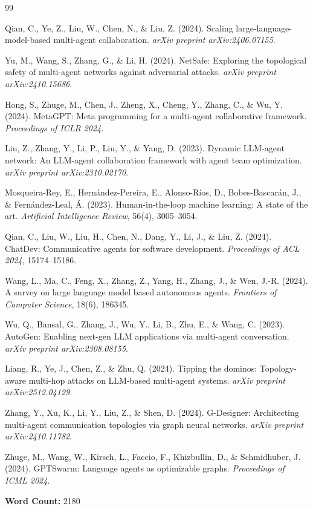 \documentclass[12pt, a4paper]{article}
\begin{document}
\newpage
\begin{thebibliography}{99}

Qian, C., Ye, Z., Liu, W., Chen, N., \& Liu, Z. (2024). Scaling large-language-model-based multi-agent collaboration. \textit{arXiv preprint arXiv:2406.07155}.

Yu, M., Wang, S., Zhang, G., \& Li, H. (2024). NetSafe: Exploring the topological safety of multi-agent networks against adversarial attacks. \textit{arXiv preprint arXiv:2410.15686}.

Hong, S., Zhuge, M., Chen, J., Zheng, X., Cheng, Y., Zhang, C., \& Wu, Y. (2024). MetaGPT: Meta programming for a multi-agent collaborative framework. \textit{Proceedings of ICLR 2024}.

Liu, Z., Zhang, Y., Li, P., Liu, Y., \& Yang, D. (2023). Dynamic LLM-agent network: An LLM-agent collaboration framework with agent team optimization. \textit{arXiv preprint arXiv:2310.02170}.

Mosqueira-Rey, E., Hern\'{a}ndez-Pereira, E., Alonso-R\'{i}os, D., Bobes-Bascar\'{a}n, J., \& Fern\'{a}ndez-Leal, \'{A}. (2023). Human-in-the-loop machine learning: A state of the art. \textit{Artificial Intelligence Review}, 56(4), 3005--3054.

Qian, C., Liu, W., Liu, H., Chen, N., Dang, Y., Li, J., \& Liu, Z. (2024). ChatDev: Communicative agents for software development. \textit{Proceedings of ACL 2024}, 15174--15186.

Wang, L., Ma, C., Feng, X., Zhang, Z., Yang, H., Zhang, J., \& Wen, J.-R. (2024). A survey on large language model based autonomous agents. \textit{Frontiers of Computer Science}, 18(6), 186345.

Wu, Q., Bansal, G., Zhang, J., Wu, Y., Li, B., Zhu, E., \& Wang, C. (2023). AutoGen: Enabling next-gen LLM applications via multi-agent conversation. \textit{arXiv preprint arXiv:2308.08155}.

Liang, R., Ye, J., Chen, Z., \& Zhu, Q. (2024). Tipping the dominos: Topology-aware multi-hop attacks on LLM-based multi-agent systems. \textit{arXiv preprint arXiv:2512.04129}.

Zhang, Y., Xu, K., Li, Y., Liu, Z., \& Shen, D. (2024). G-Designer: Architecting multi-agent communication topologies via graph neural networks. \textit{arXiv preprint arXiv:2410.11782}.

Zhuge, M., Wang, W., Kirsch, L., Faccio, F., Khizbullin, D., \& Schmidhuber, J. (2024). GPTSwarm: Language agents as optimizable graphs. \textit{Proceedings of ICML 2024}.

\end{thebibliography}

\bigskip
\noindent\textbf{Word Count:} 2180
\end{document}
